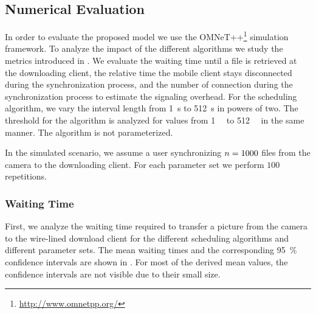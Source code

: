 \subsection{Numerical Evaluation}\label{sec:application:cloud_file_synchronisation:numerical_evaluation}
In order to evaluate the proposed model we use the OMNeT++\footnote{\url{http://www.omnetpp.org/}} simulation framework.
To analyze the impact of the different algorithms we study the metrics introduced in .
We evaluate the waiting time \sojournTime until a file is retrieved at the downloading client, the relative time the mobile client stays disconnected \relativeDisconnectedTime during the synchronization process, and the number of connection \connectionCount during the synchronization process to estimate the signaling overhead.
For the \algointerval scheduling algorithm, we vary the interval length from \SI{1}{\second} to \SI{512}{\second} in powers of two.
The threshold for the \algosize algorithm is analyzed for values from \SI{1}{\mega\byte} to \SI{512}{\mega\byte} in the same manner.
The \algoimmediate algorithm is not parameterized.

In the simulated scenario, we assume a user synchronizing \(n = 1000\) files from the camera to the downloading client.
For each parameter set we perform \(100\) repetitions.

\subsubsection*{Waiting Time}\label{sec:application:cloud_file_synchronisation:numerical_evaluation:waiting_time}
First, we analyze the waiting time \sojournTime required to transfer a picture from the camera to the wire-lined download client for the different scheduling algorithms and different parameter sets.
The mean waiting times and the corresponding \SI{95}{\percent} confidence intervals are shown in .
For most of the derived mean values, the confidence intervals are not visible due to their small size.

